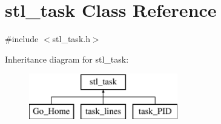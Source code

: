 \hypertarget{classstl__task}{\section{stl\-\_\-task Class Reference}
\label{classstl__task}
}


{\ttfamily \#include $<$stl\-\_\-task.\-h$>$}

Inheritance diagram for stl\-\_\-task\-:\begin{figure}[H]
\begin{center}
\leavevmode
\includegraphics[height=2.000000cm]{classstl__task}
\end{center}
\end{figure}
